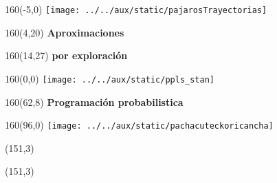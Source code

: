 \documentclass[shownotes,aspectratio=169]{beamer}
\begin{document}
\begin{frame}
\begin{textblock}{160}(-5,0) \centering
\texttt{[image: ../../aux/static/pajarosTrayectorias]}
\end{textblock}
\begin{textblock}{160}(4,20)
\LARGE \textcolor{black!6}{\fontsize{22}{0}\selectfont \textbf{Aproximaciones}}
\end{textblock}
\begin{textblock}{160}(14,27)
\LARGE \textcolor{black!6}{\fontsize{22}{0}\selectfont \textbf{por exploración}}
\end{textblock}


\end{frame}

\begin{frame}
\begin{textblock}{160}(0,0) \centering
\texttt{[image: ../../aux/static/ppls\_stan]}
\end{textblock}
\begin{textblock}{160}(62,8)
\LARGE \textcolor{black!25}{\fontsize{22}{0}\selectfont \textbf{Programación probabilistica}}
\end{textblock}


\end{frame}

\begin{frame}

\begin{textblock}{160}(96,0)
\texttt{[image: ../../aux/static/pachacuteckoricancha]}
\end{textblock}


\begin{textblock}{80}(151,3)
\LARGE  \textcolor{black!85}{}
\end{textblock}
\begin{textblock}{80}(151,3)
\LARGE  \textcolor{black!85}{\scalebox{1.6}{$p$}}
\end{textblock}


\end{frame}
\end{document}

